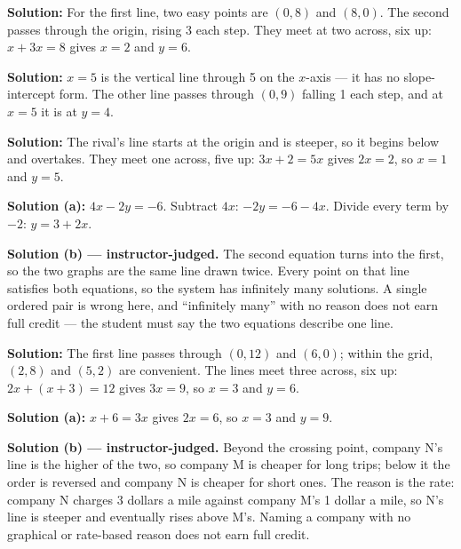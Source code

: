 \documentclass[12pt]{article}
\begin{document}
\textbf{Solution:} For the first line, two easy points are $(0, 8)$ and
$(8, 0)$. The second passes through the origin, rising 3 each step. They meet
at two across, six up: $x + 3x = 8$ gives $x = 2$ and $y = 6$.


\textbf{Solution:} $x = 5$ is the vertical line through 5 on the $x$-axis --- it
has no slope-intercept form. The other line passes through $(0, 9)$ falling 1
each step, and at $x = 5$ it is at $y = 4$. 


\textbf{Solution:} The rival's line starts at the origin and is steeper, so it
begins below and overtakes. They meet one across, five up: $3x + 2 = 5x$ gives
$2x = 2$, so $x = 1$ and $y = 5$. 


\textbf{Solution (a):} $4x - 2y = -6$. Subtract $4x$: $-2y = -6 - 4x$. Divide
every term by $-2$: $y = 3 + 2x$. 

\textbf{Solution (b) --- instructor-judged.} The second equation turns into
the first, so the two graphs are the same line drawn twice. Every point on
that line satisfies both equations, so the system has infinitely many
solutions. A single ordered pair is wrong here, and ``infinitely many'' with
no reason does not earn full credit --- the student must say the two equations
describe one line.


\textbf{Solution:} The first line passes through $(0, 12)$ and $(6, 0)$;
within the grid, $(2, 8)$ and $(5, 2)$ are convenient. The lines meet three
across, six up: $2x + (x + 3) = 12$ gives $3x = 9$, so $x = 3$ and $y = 6$.


\textbf{Solution (a):} $x + 6 = 3x$ gives $2x = 6$, so $x = 3$ and $y = 9$.

\textbf{Solution (b) --- instructor-judged.} Beyond the crossing point,
company N's line is the higher of the two, so company M is cheaper for long
trips; below it the order is reversed and company N is cheaper for short ones.
The reason is the rate: company N charges 3 dollars a mile against company M's
1 dollar a mile, so N's line is steeper and eventually rises above M's. Naming
a company with no graphical or rate-based reason does not earn full credit.
\end{document}

